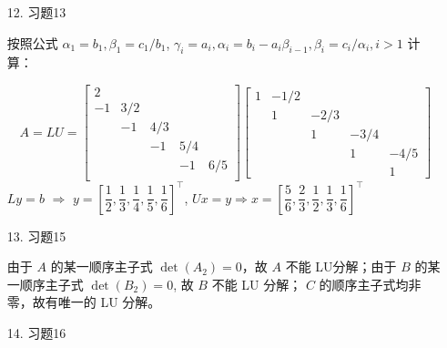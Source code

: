 \documentclass{article}
\begin{document}
\begin{itemize}
\begin{spacing}{1.5}
$$\begin{array}{ll}
\begin{array}{cccc}
    \end{array}\right]\\
    &= \dfrac{1}{85} \left[\begin{array}{cccc}
        -4 &   50 &  -23 &  -80 \\   33 &  -30 &   41 &   65 \\  -19 &   25 &   -3 &  -40 \\   -3 &   -5 &    4 &   25
    \end{array}\right]
    \end{array}
    $$
    \end{spacing}

    \item [12.] 习题13
    
    按照公式 $\alpha_1 = b_1, \beta_1 = c_1/b_1$, $\gamma_i = a_i, \alpha_i = b_i - a_i\beta_{i-1}, \beta_i = c_i/\alpha_i, i>1$ 计算：

    $$
    A = LU = 
    \left[\begin{array}{ccccc}
        2 & & & & \\
        -1 & 3/2 & & & \\
          & -1 & 4/3 & & \\
          &    &  -1 & 5/4 & \\
          &    &     &  -1 & 6/5 \\
    \end{array}\right]
    \left[\begin{array}{ccccc}
        1 & -1/2 & & & \\
          & 1  & -2/3 & & \\
          &    & 1 & -3/4 & \\
          &    &   & 1    & -4/5 \\
          & & & & 1

    \end{array}\right]
    $$
    $Ly = b$ $\Rightarrow$ $y = \left[\dfrac{1}{2},\dfrac{1}{3},\dfrac{1}{4},\dfrac{1}{5},\dfrac{1}{6}\right]^\top$,
    $Ux = y \Rightarrow x = \left[\dfrac{5}{6},\dfrac{2}{3}, \dfrac{1}{2}, \dfrac{1}{3}, \dfrac{1}{6}\right]^\top$
    
    \item [13.] 习题15
    
    由于 $A$ 的某一顺序主子式 $\det(A_2) = 0$，故 $A$ 不能 LU分解；由于 $B$ 的某一顺序主子式 $\det(B_2) = 0$, 故 $B$ 不能 LU 分解； $C$ 的顺序主子式均非零，故有唯一的 LU 分解。

    \item [14.] 习题16
    

\end{itemize}
\end{document}
